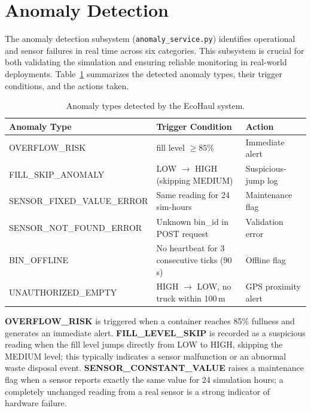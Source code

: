 \documentclass[12pt,a4paper]{report}
\begin{document}
\section{Anomaly Detection}

\indent The anomaly detection subsystem (\texttt{anomaly\_service.py}) identifies operational and sensor failures in real time across six categories. This subsystem is crucial for both validating the simulation and ensuring reliable monitoring in real-world deployments. Table~\ref{tab:anomaly_types} summarizes the detected anomaly types, their trigger conditions, and the actions taken.



\begin{table}[H]
\centering
\caption{Anomaly types detected by the EcoHaul system.}
\label{tab:anomaly_types}
\small %
\begin{tabular}{lp{6cm}l} %
\toprule
\textbf{Anomaly Type} & \textbf{Trigger Condition} & \textbf{Action} \\
\midrule
OVERFLOW\_RISK & fill level $\geq 85\%$ & Immediate alert \\
\addlinespace %
FILL\_SKIP\_ANOMALY & LOW $\rightarrow$ HIGH (skipping MEDIUM) & Suspicious-jump log \\
\addlinespace
SENSOR\_FIXED\_VALUE\_ERROR & Same reading for 24 sim-hours & Maintenance flag \\
\addlinespace
SENSOR\_NOT\_FOUND\_ERROR & Unknown bin\_id in POST request & Validation error \\
\addlinespace
BIN\_OFFLINE & No heartbeat for 3 consecutive ticks (90\,s) & Offline flag \\
\addlinespace
UNAUTHORIZED\_EMPTY & HIGH $\rightarrow$ LOW, no truck within 100\,m & GPS proximity alert \\
\bottomrule
\end{tabular}
\end{table}
\indent

\indent \textbf{OVERFLOW\_RISK} is triggered when a container reaches 85\% fullness and generates an immediate alert. \textbf{FILL\_LEVEL\_SKIP} is recorded as a suspicious reading when the fill level jumps directly from LOW to HIGH, skipping the MEDIUM level; this typically indicates a sensor malfunction or an abnormal waste disposal event. \textbf{SENSOR\_CONSTANT\_VALUE} raises a maintenance flag when a sensor reports exactly the same value for 24 simulation hours; a completely unchanged reading from a real sensor is a strong indicator of hardware failure.
\end{document}
